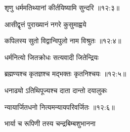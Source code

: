 
{\devanagarifont शृणु धर्ममतिथ्यानां कीर्तयिष्यामि सुन्दरि {॥१२:३॥} \veg\dontdisplaylinenum }%
 

 
{\devanagarifont आसीद्वृत्तं पुराख्यानं नगरे कुसुमाह्वये \thinspace{\dandab} \dontdisplaylinenum }%


{\devanagarifont कपिलस्य सुतो विद्वान्विपुलो नाम विश्रुतः {॥१२:४॥} \veg\dontdisplaylinenum }%
 
{\devanagarifont धर्मनित्यो जितक्रोधः सत्यवादी जितेन्द्रियः \thinspace{\dandab} \dontdisplaylinenum }%


{\devanagarifont ब्रह्मण्यश्च कृतज्ञश्च मद्भक्तः कृतनिश्चयः {॥१२:५॥} \veg\dontdisplaylinenum }%

{\devanagarifont धनाढ्यो ऽतिथिपूज्यश्च दाता दान्तो दयालुकः \thinspace{\dandab} \dontdisplaylinenum }%


{\devanagarifont न्यायार्जितधनो नित्यमन्यायपरिवर्जितः {॥१२:६॥} \veg\dontdisplaylinenum }%

{\devanagarifont भार्या च रूपिणी तस्य चन्द्रबिम्बशुभानना \thinspace{\dandab} \dontdisplaylinenum }%

